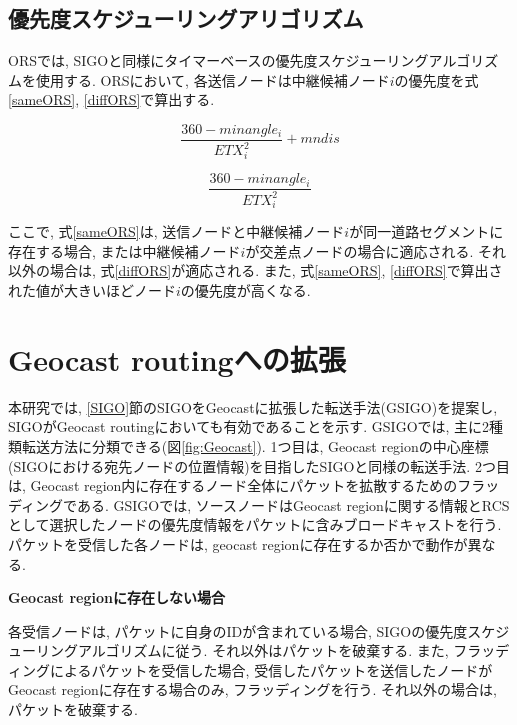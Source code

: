 \documentclass[10pt]{jreport}
\begin{document}
\subsection{優先度スケジューリングアリゴリズム}
\label{ORS_priority}

ORSでは, SIGOと同様にタイマーベースの優先度スケジューリングアルゴリズムを使用する. ORSにおいて, 各送信ノードは中継候補ノード$i$の優先度を式\ref{sameORS}, \ref{diffORS}で算出する. 

\begin{equation}
	\label{sameORS}
	\frac{360 - minangle_i}{ETX_{i}^{2}} + mndis
\end{equation}

\begin{equation}
	\label{diffORS}
	\frac{360 - minangle_i}{ETX_{i}^{2}} 
\end{equation}

ここで, 式\ref{sameORS}は, 送信ノードと中継候補ノード$i$が同一道路セグメントに存在する場合, または中継候補ノード$i$が交差点ノードの場合に適応される. それ以外の場合は, 式\ref{diffORS}が適応される.
また, 式\ref{sameORS}, \ref{diffORS}で算出された値が大きいほどノード$i$の優先度が高くなる.


\section{Geocast routingへの拡張}
本研究では, \ref{SIGO}節のSIGOをGeocastに拡張した転送手法(GSIGO)を提案し, SIGOがGeocast routingにおいても有効であることを示す. GSIGOでは, 主に2種類転送方法に分類できる(図\ref{fig:Geocast}). 1つ目は, Geocast regionの中心座標(SIGOにおける宛先ノードの位置情報)を目指したSIGOと同様の転送手法. 2つ目は, Geocast region内に存在するノード全体にパケットを拡散するためのフラッディングである. 
GSIGOでは, ソースノードはGeocast regionに関する情報とRCSとして選択したノードの優先度情報をパケットに含みブロードキャストを行う.
パケットを受信した各ノードは, geocast regionに存在するか否かで動作が異なる.

\par
\vspace{5mm}
\noindent
\textbf{Geocast regionに存在しない場合}
\vspace{5mm}

各受信ノードは, パケットに自身のIDが含まれている場合, SIGOの優先度スケジューリングアルゴリズムに従う. それ以外はパケットを破棄する. また, フラッディングによるパケットを受信した場合, 受信したパケットを送信したノードがGeocast regionに存在する場合のみ, フラッディングを行う. それ以外の場合は, パケットを破棄する.
\end{document}
